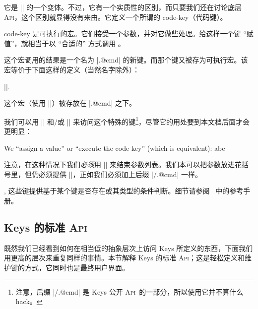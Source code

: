 \documentclass[a4paper,doc2]{ltxdoc}
\def\API{\textsc{Api}}%
\begin{document}
\begin{command}{\pgfkeysdef{}}
	它是 |\pgfkeyssetvalue| 的一个变体。不过，它有一个实质性的区别，而只要我们还在讨论底层 \API，这个区别就显得没有来由。它定义一个所谓的 code-key（代码键）。

	code-key 是可执行的宏。它们接受一个参数，并对它做些处理。给这样一个键 ``赋值''，就相当于以 ``合适的'' 方式调用 。

	这个宏调用的结果是一个名为 |.@cmd| 的新键。而那个键又被存为可执行宏。该宏等价于下面这样的定义（当然名字除外）：

	|\def\macro#1\pgfeov|.

	这个宏（使用 |\pgfkeyslet|）被存放在 |.@cmd| 之下。

	我们可以用 |\pgfkeysgetvalue| 和/或 |\pgfkeysvalueof| 来访问这个特殊的键\footnote{注意，后缀 |/.@cmd| 是 \PGF Keys 公开 \API\ 的一部分，所以使用它并不算什么 hack。}，尽管它的用处要到本文档后面才会更明显：

\begin{codeexample}[]
%

We ``assign a value'' or ``execute the code key'' (which is equivalent):
abc\pgfeov
\end{codeexample}
	注意，在这种情况下我们\emph{必须}用 |\pgfeov| 来结束参数列表。我们本可以把参数放进花括号里，但仍必须提供 |\pgfeov|，正如我们必须加上后缀 |/.@cmd| 一样。

\end{command}

\begin{commandlist}{%
	\pgfkeysifdefined{},
	\pgfkeysifassignable{}}
	这些键提供基于某个键是否存在或其类型的条件判断。细节请参阅~\cite{tikz} 中的参考手册。
\end{commandlist}

\subsection{\PGF Keys 的标准 \API}
\begingroup
{}
既然我们已经看到如何在相当低的抽象层次上访问 \PGF Keys 所定义的东西，下面我们用更高的层次来重复同样的事情。本节解释 \PGF Keys 的标准 \API；这是轻松定义和维护键的方式，它同时也是最终用户界面。
\end{document}
